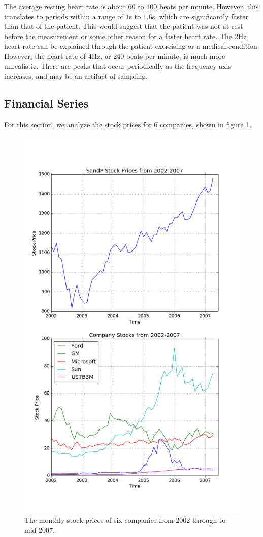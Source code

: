 \documentclass[11pt, letterpage, twocolumn]{article}
\begin{document}
The average resting heart rate is about $60$ to $100$ beats per minute. However,
this translates to periods within a range of $1$s to $1.6$s, which are
significantly faster than that of the patient. This would suggest that the
patient was not at rest before the measurement or some other reason for a faster
heart rate. The $2$Hz heart rate can be explained through the patient
exercising or a medical condition. However, the heart rate of $4$Hz,
or $240$ beats per minute, is much more unrealistic. There are peaks
that occur periodically as the frequency axis increases, and may be an
artifact of sampling.

\subsection{Financial Series}
For this section, we analyze the stock prices for 6 companies, shown in figure
\ref{fig:stocks_time}.

\begin{figure}
  \includegraphics[width=\linewidth]{stocks_time.png}
  \caption{
    The monthly stock prices of six companies from $2002$ through to mid-$2007$.
  }
  \label{fig:stocks_time}
\end{figure}
\end{document}

